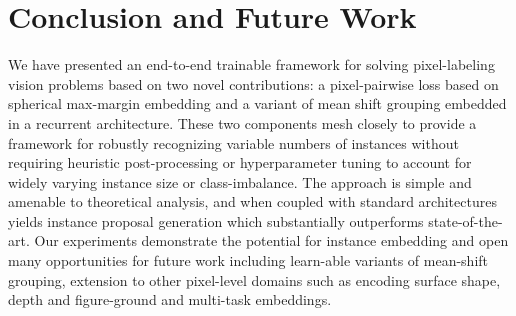 \documentclass[10pt,twocolumn,letterpaper]{article}
\begin{document}
\section{Conclusion and Future Work}
We have presented an end-to-end trainable framework for solving pixel-labeling
vision problems based on two novel contributions: a pixel-pairwise loss based
on spherical max-margin embedding and a variant of mean shift grouping embedded
in a recurrent architecture. These two components mesh closely to provide a
framework for robustly recognizing variable numbers of instances without
requiring heuristic post-processing or hyperparameter tuning to account for
widely varying instance size or class-imbalance. The approach is simple and
amenable to theoretical analysis, and when coupled with standard architectures
yields instance proposal generation which substantially outperforms
state-of-the-art. Our experiments demonstrate the potential for instance
embedding and open many opportunities for future work including learn-able
variants of mean-shift grouping, extension to other pixel-level domains such as
encoding surface shape, depth and figure-ground and multi-task embeddings.

\end{document}
